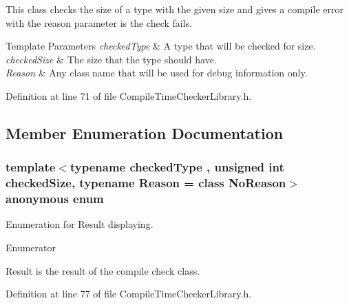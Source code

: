 This class checks the size of a type with the given size and gives a compile error with the reason parameter is the check fails. 


\begin{DoxyTemplParams}{Template Parameters}
{\em checked\-Type} & A type that will be checked for size. \\
\hline
{\em checked\-Size} & The size that the type should have. \\
\hline
{\em Reason} & Any class name that will be used for debug information only. \\
\hline
\end{DoxyTemplParams}


Definition at line 71 of file Compile\-Time\-Checker\-Library.\-h.



\subsection{Member Enumeration Documentation}
\hypertarget{class_size_check_a63104e95e61670b9f2b89af60512c866}{\subsubsection[{anonymous enum}]{\setlength{\rightskip}{0pt plus 5cm}template$<$typename checked\-Type , unsigned int checked\-Size, typename Reason  = class No\-Reason$>$ anonymous enum}}\label{class_size_check_a63104e95e61670b9f2b89af60512c866}


Enumeration for Result displaying. 

\begin{Desc}
\item[Enumerator]\par
\begin{description}
\item[{\em 
\hypertarget{class_size_check_a63104e95e61670b9f2b89af60512c866a8eec13abbe1b0ca10baf99b76909c77f}{Result}\label{class_size_check_a63104e95e61670b9f2b89af60512c866a8eec13abbe1b0ca10baf99b76909c77f}
}]Result is the result of the compile check class. \end{description}
\end{Desc}


Definition at line 77 of file Compile\-Time\-Checker\-Library.\-h.



